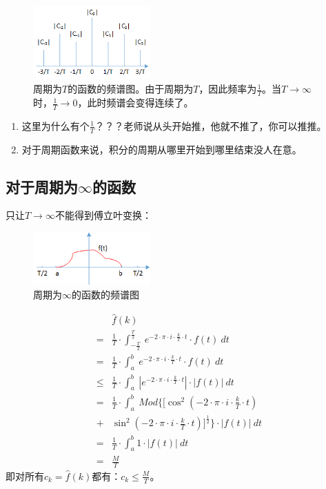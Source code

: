 \begin{figure}[H]
	\centering
	\includegraphics[width=0.4\textwidth]{assets/ft2.png}
	\caption{周期为$T$的函数的频谱图。由于周期为$T$，因此频率为$\frac{1}{T}$。当$T\rightarrow\infty$时，$\frac{1}{T}\rightarrow 0$，此时频谱会变得连续了。}
\end{figure}
\begin{enumerate}
	\item 这里为什么有个$\frac{1}{T}$？？？老师说从头开始推，他就不推了，你可以推推。
	\item 对于周期函数来说，积分的周期从哪里开始到哪里结束没人在意。
\end{enumerate}
\subsection{对于周期为$\infty$的函数}
只让$T\rightarrow \infty$不能得到傅立叶变换：
\begin{figure}[H]
	\centering
	\includegraphics[width=0.4\textwidth]{assets/ft3.png}
	\caption{周期为$\infty$的函数的频谱图}
\end{figure}
\begin{align*}
	     & \hat{f}(k)                                                                                                       \\
	=    & \frac{1}{T}\cdot \int_{-\frac{T}{2}}^{\frac{T}{2}}\ e^{-2\cdot \pi\cdot i\cdot \frac{k}{T}\cdot t}\cdot f(t)\ dt \\
	=    & \frac{1}{T}\cdot \int_{a}^{b}\ e^{-2\cdot \pi\cdot i\cdot \frac{k}{T}\cdot t}\cdot f(t)\ dt                      \\
	\leq & \frac{1}{T}\cdot \int_{a}^{b}\ |e^{-2\cdot \pi\cdot i\cdot \frac{k}{T}\cdot t}|\cdot |f(t)|\ dt                  \\
	=    & \frac{1}{T}\cdot \int_{a}^{b}\ Mod\{[\cos^2(-2\cdot \pi\cdot i\cdot \frac{k}{T}\cdot t)                          \\
	+    & \sin^2(-2\cdot \pi\cdot i\cdot \frac{k}{T}\cdot t)]^{\frac{1}{2}}\}\cdot |f(t)|\ dt                              \\
	=    & \frac{1}{T}\cdot \int_a^b 1\cdot |f(t)|\ dt                                                                      \\
	=    & \frac{M}{T}
\end{align*}
即对所有$c_k=\hat{f}(k)$都有：$c_k\leq \frac{M}{T}$。

